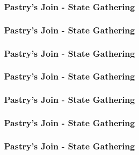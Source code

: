 \documentclass{beamer}
\begin{document}

\begin{frame}
  \frametitle{Pastry's Join - State Gathering}
  \begin{center}
  \end{center}
\end{frame}

\begin{frame}
  \frametitle{Pastry's Join - State Gathering}
  \begin{center}
  \end{center}
\end{frame}

\begin{frame}
  \frametitle{Pastry's Join - State Gathering}
  \begin{center}
  \end{center}
\end{frame}

\begin{frame}
  \frametitle{Pastry's Join - State Gathering}
  \begin{center}
  \end{center}
\end{frame}

\begin{frame}
  \frametitle{Pastry's Join - State Gathering}
  \begin{center}
  \end{center}
\end{frame}

\begin{frame}
  \frametitle{Pastry's Join - State Gathering}
  \begin{center}
  \end{center}
\end{frame}

\begin{frame}
  \frametitle{Pastry's Join - State Gathering}
  \begin{center}
  \end{center}
\end{frame}
\end{document}
